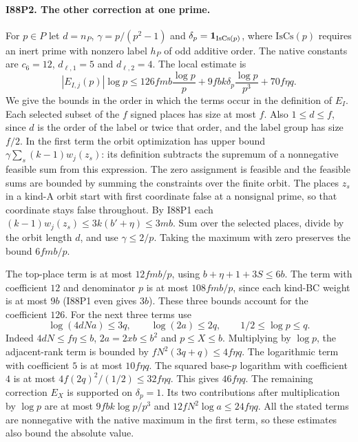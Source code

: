 \paragraph{I88P2. The other correction at one prime.}
For $p\in P$ let $d=n_P$, $\gamma=p/(p^2-1)$ and
$\delta_p={\bf1}_{\mathrm{IsCs}(p)}$, where $\mathrm{IsCs}(p)$
requires an inert prime with nonzero label $h_P$ of odd additive
order. The native constants are $c_6=12$, $d_{\ell,1}=5$ and
$d_{\ell,2}=4$. The local estimate is
\[
 |E_{I,j}(p)|\log p
 \le 126 fmb\frac{\log p}{p}
     +9fbk\delta_p\frac{\log p}{p^3}
     +70f\eta q .
\]
We give the bounds in the order in which the terms occur in the
definition of $E_I$. Each selected subset of the $f$ signed
places has size at most $f$. Also $1\le d\le f$, since $d$ is the
order of the label or twice that order, and the label group has
size $f/2$. In the first term the orbit optimization has upper
bound $\gamma\sum_s (k-1)w_j(z_s)$: its definition subtracts
the supremum of a nonnegative feasible sum from this expression.
The zero assignment is feasible and the feasible sums are
bounded by summing the constraints over the finite orbit.
The places $z_s$ in a kind-A orbit start with first coordinate false
at a nonsignal prime, so that coordinate stays false throughout.
By I88P1 each $(k-1)w_j(z_s)\le3k(b'+\eta)\le3mb$.
Sum over the selected places, divide by the orbit length $d$,
and use $\gamma\le2/p$. Taking the maximum with zero preserves the
bound $6fmb/p$.

The top-place term is at most $12fmb/p$, using
$b+\eta+1+3S\le6b$. The term with coefficient $12$ and
denominator $p$ is at most $108fmb/p$, since each kind-BC
weight is at most $9b$ (I88P1 even gives $3b$).
These three bounds account for the coefficient $126$.
For the next three terms use
\[
 \log(4dNa)\le3q,\qquad \log(2a)\le2q,\qquad
 1/2\le\log p\le q .
\]
Indeed $4dN\le f\eta\le b$, $2a=2xb\le b^2$ and $p\le X\le b$.
Multiplying by $\log p$, the adjacent-rank term is bounded by
$fN^2(3q+q)\le4f\eta q$. The logarithmic term with coefficient
$5$ is at most $10f\eta q$. The squared base-$p$ logarithm with
coefficient $4$ is at most
$4f(2q)^2/(1/2)\le32f\eta q$. This gives $46f\eta q$.
The remaining correction $E_X$ is supported on $\delta_p=1$.
Its two contributions after multiplication by $\log p$
are at most $9fbk\log p/p^3$ and $12fN^2\log a\le24f\eta q$.
All the stated terms are nonnegative with the native maximum in the
first term, so these estimates also bound the absolute value.

